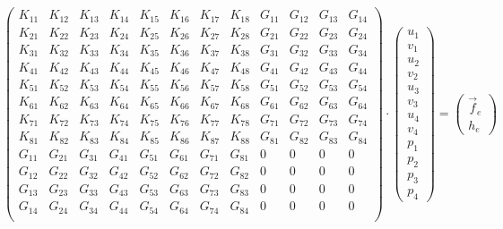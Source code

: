 \begin{small}
\[
\left(\begin{array}{cccccccccccc}
K_{11} & K_{12} & K_{13} & K_{14} & K_{15} & K_{16} & K_{17} & K_{18} & G_{11} & G_{12} & G_{13} & G_{14} \\
K_{21} & K_{22} & K_{23} & K_{24} & K_{25} & K_{26} & K_{27} & K_{28} & G_{21} & G_{22} & G_{23} & G_{24} \\
K_{31} & K_{32} & K_{33} & K_{34} & K_{35} & K_{36} & K_{37} & K_{38} & G_{31} & G_{32} & G_{33} & G_{34} \\
K_{41} & K_{42} & K_{43} & K_{44} & K_{45} & K_{46} & K_{47} & K_{48} & G_{41} & G_{42} & G_{43} & G_{44} \\
K_{51} & K_{52} & K_{53} & K_{54} & K_{55} & K_{56} & K_{57} & K_{58} & G_{51} & G_{52} & G_{53} & G_{54} \\
K_{61} & K_{62} & K_{63} & K_{64} & K_{65} & K_{66} & K_{67} & K_{68} & G_{61} & G_{62} & G_{63} & G_{64} \\
K_{71} & K_{72} & K_{73} & K_{74} & K_{75} & K_{76} & K_{77} & K_{78} & G_{71} & G_{72} & G_{73} & G_{74} \\
K_{81} & K_{82} & K_{83} & K_{84} & K_{85} & K_{86} & K_{87} & K_{88} & G_{81} & G_{82} & G_{83} & G_{84} \\
G_{11} & G_{21} & G_{31} & G_{41} & G_{51} & G_{61} & G_{71} & G_{81} & 0 &0 &0 &0 \\
G_{12} & G_{22} & G_{32} & G_{42} & G_{52} & G_{62} & G_{72} & G_{82} & 0 &0 &0 &0 \\
G_{13} & G_{23} & G_{33} & G_{43} & G_{53} & G_{63} & G_{73} & G_{83} & 0 &0 &0 &0 \\
G_{14} & G_{24} & G_{34} & G_{44} & G_{54} & G_{64} & G_{74} & G_{84} & 0 &0 &0 &0 \\
\end{array} \right)
\cdot
\begin{pmatrix}
u_1 \\ v_1 \\ 
u_2 \\ v_2 \\ 
u_3 \\ v_3 \\ 
u_4 \\ v_4 \\
p_1 \\ p_2 \\ p_3 \\ p_4
\end{pmatrix}
=
\begin{pmatrix}
\vec{f}_e \\ h_{e}
\end{pmatrix}
\]
\end{small}

